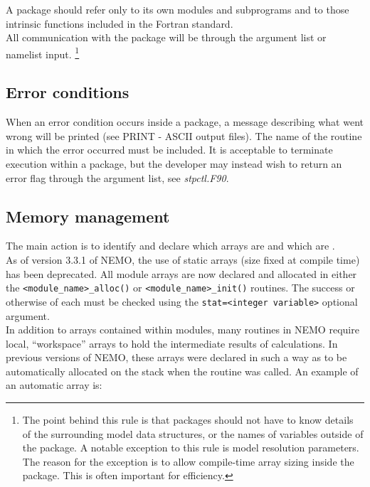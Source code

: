 \documentclass{article}
\begin{document}
A package should refer only to its own modules and subprograms and to those intrinsic functions included in
the Fortran standard. \\
All communication with the package will be through the argument list or namelist input.
\footnote{
  The point behind this rule is that packages should not have to know details of
  the surrounding model data structures, or the names of variables outside of the package.
  A notable exception to this rule is model resolution parameters.
  The reason for the exception is to allow compile-time array sizing inside the package.
  This is often important for efficiency.
}

\subsection{Error conditions}

When an error condition occurs inside a package, a message describing what went wrong will be printed
(see PRINT - ASCII output files).
The name of the routine in which the error occurred must be included.
It is acceptable to terminate execution within a package, but
the developer may instead wish to return an error flag through the argument list,
see \textit{stpctl.F90}.

\subsection{Memory management}

The main action is to identify and declare which arrays are  and which are . \\
As of version 3.3.1 of NEMO, the use of static arrays (size fixed at compile time) has been deprecated.
All module arrays are now declared  and
allocated in either the \texttt{<module\_name>\_alloc()} or \texttt{<module\_name>\_init()} routines.
The success or otherwise of each  must be checked using
the \texttt{stat=<integer\ variable>} optional argument. \\

In addition to arrays contained within modules, many routines in NEMO require local, ``workspace'' arrays to
hold the intermediate results of calculations.
In previous versions of NEMO, these arrays were declared in such a way as to be automatically allocated on
the stack when the routine was called.
An example of an automatic array is:
\end{document}
